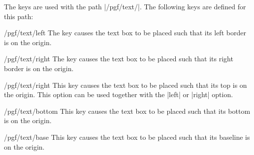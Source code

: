\begin{command}{\pgftext{}}
  The  keys are used with the path |/pgf/text/|. The
  following keys are defined for this path:
  \begin{key}{/pgf/text/left}
    The key causes the text box to be placed such that its left
    border is on the origin.
\begin{codeexample}[]
\end{codeexample}
  \end{key}
  \begin{key}{/pgf/text/right}
    The key causes the text box to be placed such that its right
    border is on the origin.
\begin{codeexample}[]
\end{codeexample}
  \end{key}
  \begin{key}{/pgf/text/right}
    This key causes the text box to be placed such that its top is on the
    origin. This option can be used together with the |left| or
    |right| option.
\begin{codeexample}[]
\end{codeexample}
\begin{codeexample}[]
\end{codeexample}
  \end{key}
  \begin{key}{/pgf/text/bottom}
    This key causes the text box to be placed such that its bottom is
    on the origin.
\begin{codeexample}[]
\end{codeexample}
\begin{codeexample}[]
\end{codeexample}
  \end{key}
  \begin{key}{/pgf/text/base}
    This key causes the text box to be placed such that its baseline
    is on the origin.
\begin{codeexample}[]
\end{codeexample}
\begin{codeexample}[]

\end{codeexample}
\end{key}
\end{command}
